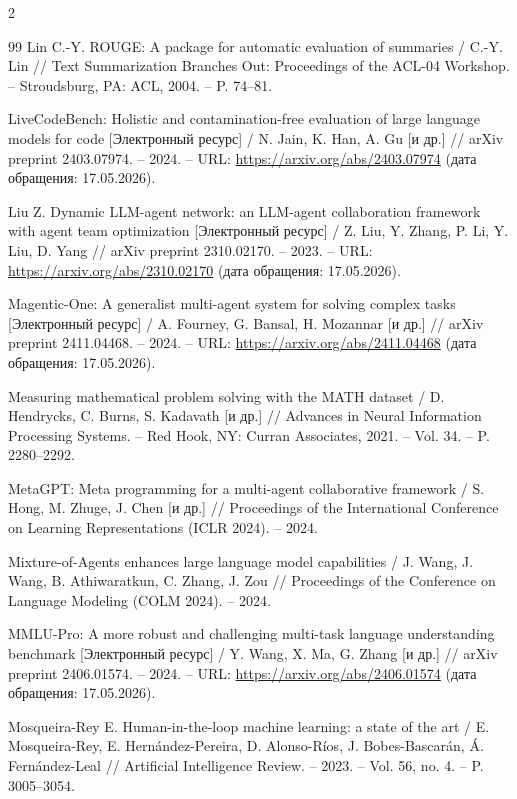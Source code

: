 \begin{multicols}{2}
\begin{thebibliography}{99}
Lin C.-Y. ROUGE: A package for automatic evaluation of summaries
/ C.-Y. Lin // Text Summarization Branches Out: Proceedings
of the ACL-04 Workshop. -- Stroudsburg, PA: ACL, 2004.
-- P. 74--81.

LiveCodeBench: Holistic and contamination-free evaluation of
large language models for code [Электронный ресурс] / N. Jain,
K. Han, A. Gu [и др.] // arXiv preprint 2403.07974. -- 2024.
-- URL: \url{https://arxiv.org/abs/2403.07974} (дата обращения: 17.05.2026).

Liu Z. Dynamic LLM-agent network: an LLM-agent collaboration
framework with agent team optimization [Электронный ресурс]
/ Z. Liu, Y. Zhang, P. Li, Y. Liu, D. Yang // arXiv preprint
2310.02170. -- 2023.
-- URL: \url{https://arxiv.org/abs/2310.02170} (дата обращения: 17.05.2026).

Magentic-One: A generalist multi-agent system for solving complex
tasks [Электронный ресурс] / A. Fourney, G. Bansal, H. Mozannar
[и др.] // arXiv preprint 2411.04468. -- 2024.
-- URL: \url{https://arxiv.org/abs/2411.04468} (дата обращения: 17.05.2026).

Measuring mathematical problem solving with the MATH dataset
/ D. Hendrycks, C. Burns, S. Kadavath [и др.] // Advances in
Neural Information Processing Systems. -- Red Hook, NY: Curran
Associates, 2021. -- Vol. 34. -- P. 2280--2292.

MetaGPT: Meta programming for a multi-agent collaborative
framework / S. Hong, M. Zhuge, J. Chen [и др.]
// Proceedings of the International Conference on Learning
Representations (ICLR 2024). -- 2024.

Mixture-of-Agents enhances large language model capabilities
/ J. Wang, J. Wang, B. Athiwaratkun, C. Zhang, J. Zou
// Proceedings of the Conference on Language Modeling
(COLM 2024). -- 2024.

MMLU-Pro: A more robust and challenging multi-task language
understanding benchmark [Электронный ресурс] / Y. Wang, X. Ma,
G. Zhang [и др.] // arXiv preprint 2406.01574. -- 2024.
-- URL: \url{https://arxiv.org/abs/2406.01574} (дата обращения: 17.05.2026).

Mosqueira-Rey E. Human-in-the-loop machine learning: a state
of the art / E. Mosqueira-Rey, E. Hern\'{a}ndez-Pereira,
D. Alonso-R\'{i}os, J. Bobes-Bascar\'{a}n,
\'{A}. Fern\'{a}ndez-Leal // Artificial Intelligence Review.
-- 2023. -- Vol. 56, no. 4. -- P. 3005--3054.


\end{thebibliography}
\end{multicols}
